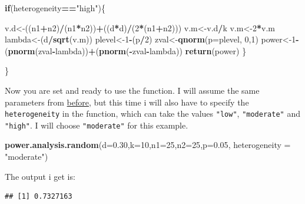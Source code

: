 \documentclass[]{book}
\newenvironment{Shaded}{\begin{snugshade}}{\end{snugshade}}
\newcommand{\ControlFlowTok}[1]{\textcolor[rgb]{0.13,0.29,0.53}{\textbf{#1}}}
\newcommand{\DataTypeTok}[1]{\textcolor[rgb]{0.13,0.29,0.53}{#1}}
\newcommand{\DecValTok}[1]{\textcolor[rgb]{0.00,0.00,0.81}{#1}}
\newcommand{\FloatTok}[1]{\textcolor[rgb]{0.00,0.00,0.81}{#1}}
\newcommand{\KeywordTok}[1]{\textcolor[rgb]{0.13,0.29,0.53}{\textbf{#1}}}
\newcommand{\NormalTok}[1]{#1}
\newcommand{\OperatorTok}[1]{\textcolor[rgb]{0.81,0.36,0.00}{\textbf{#1}}}
\newcommand{\StringTok}[1]{\textcolor[rgb]{0.31,0.60,0.02}{#1}}
\begin{document}
\begin{Shaded}
\begin{Highlighting}[]
    \ControlFlowTok{if}\NormalTok{(heterogeneity}\OperatorTok{==}\StringTok{"high"}\NormalTok{)\{}
    
\NormalTok{      v.d<-((n1}\OperatorTok{+}\NormalTok{n2)}\OperatorTok{/}\NormalTok{(n1}\OperatorTok{*}\NormalTok{n2))}\OperatorTok{+}\NormalTok{((d}\OperatorTok{*}\NormalTok{d)}\OperatorTok{/}\NormalTok{(}\DecValTok{2}\OperatorTok{*}\NormalTok{(n1}\OperatorTok{+}\NormalTok{n2)))}
\NormalTok{  v.m<-v.d}\OperatorTok{/}\NormalTok{k}
\NormalTok{  v.m<-}\DecValTok{2}\OperatorTok{*}\NormalTok{v.m}
\NormalTok{  lambda<-(d}\OperatorTok{/}\KeywordTok{sqrt}\NormalTok{(v.m))}
\NormalTok{  plevel<-}\DecValTok{1}\OperatorTok{-}\NormalTok{(p}\OperatorTok{/}\DecValTok{2}\NormalTok{)}
\NormalTok{  zval<-}\KeywordTok{qnorm}\NormalTok{(}\DataTypeTok{p=}\NormalTok{plevel, }\DecValTok{0}\NormalTok{,}\DecValTok{1}\NormalTok{)}
\NormalTok{  power<-}\DecValTok{1}\OperatorTok{-}\NormalTok{(}\KeywordTok{pnorm}\NormalTok{(zval}\OperatorTok{-}\NormalTok{lambda))}\OperatorTok{+}\NormalTok{(}\KeywordTok{pnorm}\NormalTok{(}\OperatorTok{-}\NormalTok{zval}\OperatorTok{-}\NormalTok{lambda))}
  \KeywordTok{return}\NormalTok{(power)}
\NormalTok{  \}}
    
\NormalTok{\}}
\end{Highlighting}
\end{Shaded}

Now you are set and ready to use the function. I will assume the same parameters from \protect\hyperlink{fixed.power}{before}, but this time i will also have to specify the \texttt{heterogeneity} in the function, which can take the values \texttt{"low"}, \texttt{"moderate"} and \texttt{"high"}. I will choose \texttt{"moderate"} for this example.

\begin{Shaded}
\begin{Highlighting}[]
\KeywordTok{power.analysis.random}\NormalTok{(}\DataTypeTok{d=}\FloatTok{0.30}\NormalTok{,}\DataTypeTok{k=}\DecValTok{10}\NormalTok{,}\DataTypeTok{n1=}\DecValTok{25}\NormalTok{,}\DataTypeTok{n2=}\DecValTok{25}\NormalTok{,}\DataTypeTok{p=}\FloatTok{0.05}\NormalTok{,}
                      \DataTypeTok{heterogeneity =} \StringTok{"moderate"}\NormalTok{)}
\end{Highlighting}
\end{Shaded}

The output i get is:

\begin{verbatim}
## [1] 0.7327163
\end{verbatim}
\end{document}
